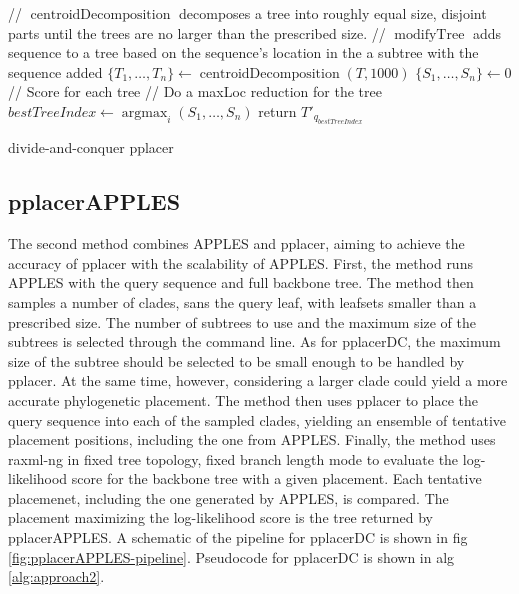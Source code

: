 \documentclass[10pt]{article}
\begin{document}
\begin{algorithm}[h]
\SetAlgoLined
{}
 // $\operatorname{centroidDecomposition}$ decomposes a tree into roughly equal size, disjoint parts until the trees are no larger than the prescribed size.\;
 // $\operatorname{modifyTree}$ adds sequence to a tree based on the sequence's location in the a subtree with the sequence added\;
 $\{T_1,\dots,T_n\} \leftarrow \operatorname{centroidDecomposition}(T,1000)$\;
 $\{S_1, \dots, S_n\} \leftarrow 0$ // Score for each tree\;
 // Do a maxLoc reduction for the tree\;
 $bestTreeIndex \leftarrow \operatorname{argmax}_{i} (S_1,\dots,S_n)$\;
 return $T'_{q_{bestTreeIndex}}$\;
 \caption{divide-and-conquer pplacer}
 \label{alg:approach1}
\end{algorithm}

\subsection{pplacerAPPLES}

The second method combines APPLES and pplacer, aiming to achieve the accuracy of pplacer with the scalability of APPLES.
First, the method runs APPLES with the query sequence and full backbone tree.
The method then samples a number of clades, sans the query leaf, with leafsets smaller
than a prescribed size.
The number of subtrees to use and the maximum size of the subtrees is selected through the command line.
As for pplacerDC, the maximum size of the subtree should be selected to be small enough to be handled by pplacer.
At the same time, however, considering a larger clade could yield a more accurate phylogenetic placement.
The method then uses pplacer to place the query sequence into each of the sampled clades, yielding
an ensemble of tentative placement positions, including the one from APPLES.
Finally, the method uses raxml-ng in fixed tree topology, fixed branch length mode to evaluate
the log-likelihood score for the backbone tree with a given placement.
Each tentative placemenet, including the one generated by APPLES, is compared.
The placement maximizing the log-likelihood score is the tree returned by pplacerAPPLES.
A schematic of the pipeline for pplacerDC is shown in fig \ref{fig:pplacerAPPLES-pipeline}.
Pseudocode for pplacerDC is shown in alg \ref{alg:approach2}.
\end{document}
